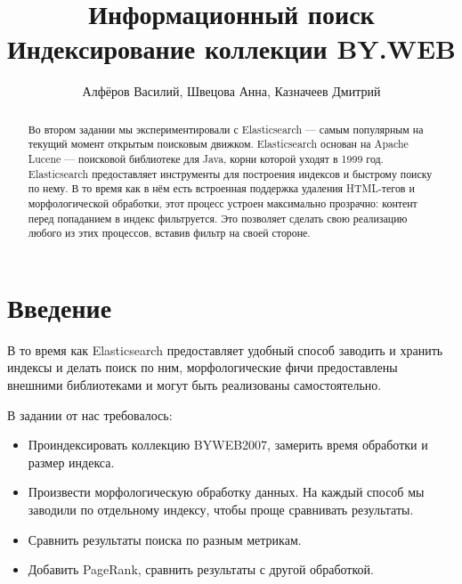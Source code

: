 \documentclass[twocolumn]{extarticle}
\title{Информационный поиск\\ Индексирование коллекции BY.WEB}
\author{Алфёров Василий, Швецова Анна, Казначеев Дмитрий}
\begin{document}
\maketitle

\begin{abstract}
    Во втором задании мы экспериментировали с Elasticsearch — самым популярным на текущий момент открытым поисковым движком. Elasticsearch основан на Apache Lucene — поисковой библиотеке для Java, корни которой уходят в 1999 год. Elasticsearch предоставляет инструменты для построения индексов и быстрому поиску по нему. В то время как в нём есть встроенная поддержка удаления HTML-тегов и морфологической обработки, этот процесс устроен максимально прозрачно: контент перед попаданием в индекс фильтруется. Это позволяет сделать свою реализацию любого из этих процессов, вставив фильтр на своей стороне.
\end{abstract}

\section{Введение}

В то время как Elasticsearch предоставляет удобный способ заводить и хранить индексы и делать поиск по ним, морфологические фичи предоставлены внешними библиотеками и могут быть реализованы самостоятельно.

В задании от нас требовалось:

\begin{itemize}
\item Проиндексировать коллекцию BYWEB2007, замерить время обработки и размер индекса.
\item Произвести морфологическую обработку данных. На каждый способ мы заводили по отдельному индексу, чтобы проще сравнивать результаты.
\item Сравнить результаты поиска по разным метрикам.
\item Добавить PageRank, сравнить результаты с другой обработкой.
\end{itemize}






\end{document}
